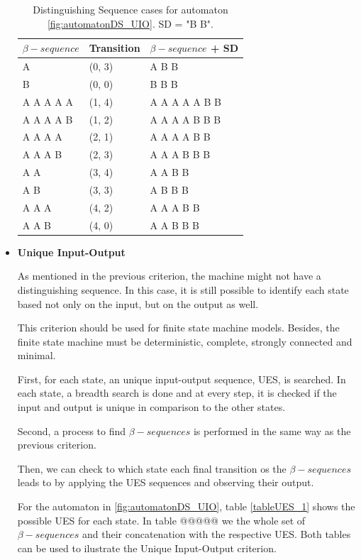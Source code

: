 \begin{itemize}
\begin{table}
\begin{center}
\begin{tabular}{| l | l| l|}

\hline

$\beta-sequence$ & Transition & $\beta-sequence$ + SD \\ \hline

A & (0, 3) & A B B\\ \hline
B & (0, 0) & B B B\\ \hline
A A A A A & (1, 4) & A A A A A B B\\ \hline
A A A A B & (1, 2) & A A A A B B B\\ \hline
A A A A & (2, 1) & A A A A B B\\ \hline
A A A B & (2, 3) & A A A B B B\\ \hline
A A & (3, 4) & A A B B\\ \hline
A B & (3, 3) & A B B B\\ \hline
A A A & (4, 2) & A A A B B\\ \hline
A A B & (4, 0) & A A B B B\\
\hline
\end{tabular}
\end{center}
\caption{Distinguishing Sequence cases for automaton \ref{fig:automatonDS_UIO}. SD = "B B".\cite{inpe10}}
\label{tableDS}
\end{table}



\item \textbf{Unique Input-Output}

As mentioned in the previous criterion, the machine might not have a distinguishing sequence. In this case, it is still possible to identify each state based not only on the input, but on the output as well.

This criterion should be used for finite state machine models. Besides, the finite state machine must be deterministic, complete, strongly connected and minimal. 

First, for each state, an unique input-output sequence, UES, is searched. In each state, a breadth search is done and at every step, it is checked if the input and output is unique in comparison to the other states.

Second, a process to find $\beta-sequences$ is performed in the same way as the previous criterion.

Then, we can check to which state each final transition os the $\beta-sequences$ leads to by applying the UES sequences and observing their output.

For the automaton in \ref{fig:automatonDS_UIO}, table \ref{tableUES_1} shows the possible UES for each state. In table @@@@@ we the whole set of $\beta-sequences$ and their concatenation with the respective UES. Both tables can be used to ilustrate the Unique Input-Output criterion.

\end{itemize}

